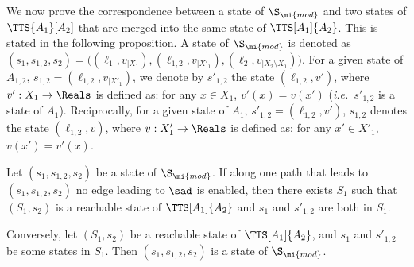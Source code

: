 \documentclass{LMCS}
\theoremstyle{plain}\newtheorem*{prop11}{Proposition~\ref{prop:states} bis}
\def\ie{{\em i.e.\ }}
\begin{document}
We now prove the
correspondence between a state of $\S_\mi{mod}$ and two states of
$\TTS{A_1}[A_2]$ that are merged into the same state of $\TTS[A_1]{A_2}$.
This is stated in the following proposition.
A state of $\S_\mi{mod}$ is denoted as $(s_1,s_{1,2},s_2)=
\big((\ell_1,v_{|X_1}),(\ell_{1,2},v_{|X'_1}),
(\ell_2,v_{|X_2\setminus X_1})\big)$. For a given state of $A_{1,2}$, $s_{1,2}=(\ell_{1,2},v_{|X'_1})$, we denote
by $s'_{1,2}$ the state $(\ell_{1,2},v')$, where $v':X_1\to\Reals$ is defined as:
for any $x\in X_1$, $v'(x)=v(x')$ (\ie $s'_{1,2}$ is a state of $A_1$).
Reciprocally, for a given
state of $A_1$, $s'_{1,2}=(\ell_{1,2},v')$,
$s_{1,2}$ denotes the state $(\ell_{1,2},v)$, where $v:X'_1\to\Reals$ is defined as:
for any  $x'\in X'_1$, $v(x')=v'(x)$.
\begin{prop}\label{prop:states}
  Let $(s_1,s_{1,2},s_2)$ be a state of $\S_\mi{mod}$. If along one path that leads to $(s_1,s_{1,2},s_2)$ no edge leading to
  $\sad$ is enabled, then there exists $S_1$ such that $(S_1,s_2)$
  is a reachable state of $\TTS[A_1]{A_2}$ and $s_1$ and $s'_{1,2}$ are
  both in $S_1$.

  Conversely, let $(S_1,s_2)$ be a reachable state of $\TTS[A_1]{A_2}$, and
  $s_1$ and $s'_{1,2}$ be some states in $S_1$.
  Then $(s_1,s_{1,2},s_2)$ is a state of $\S_\mi{mod}$.
\end{prop}
\end{document}
